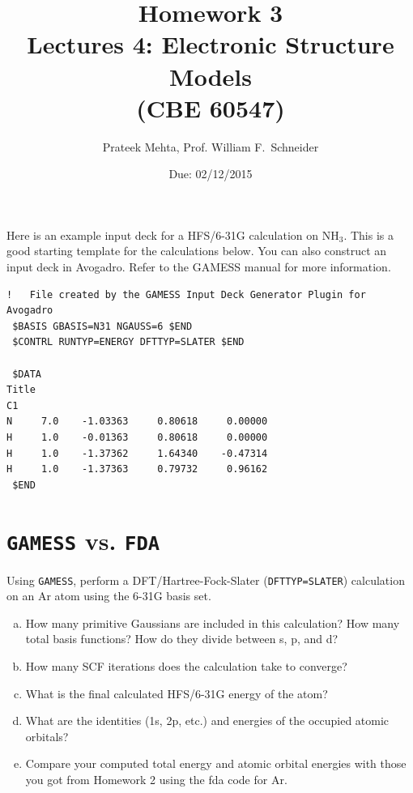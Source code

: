 \documentclass[11pt]{article}
\date{Due: 02/12/2015}
\title{}
\begin{document}
\title{Homework 3\\Lectures 4: Electronic Structure Models\\(CBE 60547)}
\author{Prateek Mehta, Prof. William F.\ Schneider}
\maketitle


Here is an example input deck for a HFS/6-31G calculation on NH$_{\text{3}}$. This is a good starting template for the calculations below. You can also construct an input deck in Avogadro. Refer to the GAMESS manual for more information.

\begin{verbatim}
!   File created by the GAMESS Input Deck Generator Plugin for Avogadro
 $BASIS GBASIS=N31 NGAUSS=6 $END
 $CONTRL RUNTYP=ENERGY DFTTYP=SLATER $END

 $DATA 
Title
C1
N     7.0    -1.03363     0.80618     0.00000
H     1.0    -0.01363     0.80618     0.00000
H     1.0    -1.37362     1.64340    -0.47314
H     1.0    -1.37363     0.79732     0.96162
 $END
\end{verbatim}


\section{\texttt{GAMESS} vs. \texttt{FDA}}
\label{sec-1}

Using \texttt{GAMESS}, perform a DFT/Hartree-Fock-Slater (\verb~DFTTYP=SLATER~) calculation on an Ar atom using the 6-31G basis set.

\begin{enumerate}[(a)]
\item How many primitive Gaussians are included in this calculation? How many total basis functions? How do they divide between s, p, and d?

\item How many SCF iterations does the calculation take to converge?

\item What is the final calculated HFS/6-31G energy of the atom?

\item What are the identities (1s, 2p, etc.) and energies of the occupied atomic orbitals?

\item Compare your computed total energy and atomic orbital energies with those you got from Homework 2 using the fda code for Ar.
\end{enumerate}
\end{document}
